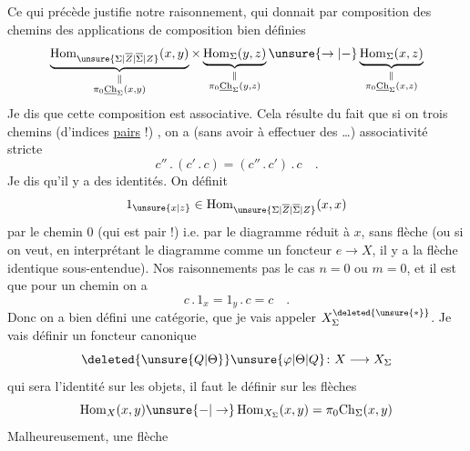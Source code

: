  Ce qui précède justifie notre raisonnement,
qui donnait par composition des chemins des
applications de composition bien définies
\[
\underbrace{\operatorname{Hom}_{\unsure{\Sigma|\overline{Z}|\overline{\Sigma}|Z}}(x,y)}_{\substack{\Vert\\\pi_0\underline{\mathrm{Ch}}_\Sigma(x,y)}}
\times\underbrace{\operatorname{Hom}_{\Sigma}(y,z)}_{\substack{\Vert\\\pi_0\underline{\mathrm{Ch}}_\Sigma(y,z)}}
\unsure{\to|\mathord{-}}
\underbrace{\operatorname{Hom}_{\Sigma}(x,z)}_{\substack{\Vert\\\pi_0\underline{\mathrm{Ch}}_\Sigma(x,z)}}
\]
Je dis que cette composition est associative. Cela
résulte du fait que si on  trois chemins (d'indices
\uline{pairs} !)
,
on a \unsure{$^{*}$} (sans avoir à effectuer des \ldots)
associativité stricte
\[
c''\mathbin{.}(c'\mathbin{.}c)=(c''\mathbin{.}c')\mathbin{.}c\quad .
\]
Je dis qu'il y a des identités. On définit
\[
1_{\unsure{x|z}}\in\operatorname{Hom}_{\unsure{\Sigma|\overline{Z}|\overline{\Sigma}|Z}}(x,x)
\]
par le chemin   $0$ (qui est pair !)
i.e. par le diagramme réduit à $x$, sans flèche
(ou si on veut, en interprétant le diagramme comme un
foncteur $e\to X$, il y a la flèche identique
sous-entendue). Nos raisonnements 
pas le cas $n=0$ ou $m=0$, et il est   que
pour un chemin
on a
\[
c\mathbin{.}1_x=1_y\mathbin{.}c=c\quad .
\]
Donc on a bien défini une catégorie, que je
vais appeler $X^{\deleted{\unsure{*}}}_{\Sigma}$. Je vais définir un
foncteur canonique
\[
\deleted{\unsure{Q|\Theta}}\unsure{\varphi|\Theta|Q}\colon X\longrightarrow X_{\Sigma}
\]
qui sera l'identité sur les objets, il faut le
définir sur les flèches
\[
\operatorname{Hom}_X(x,y)\unsure{\mathord{-}|\to}\operatorname{Hom}_{X_{\Sigma}}(x,y)=\pi_0\mathrm{Ch}_{\Sigma}(x,y)
\]
Malheureusement, une flèche
